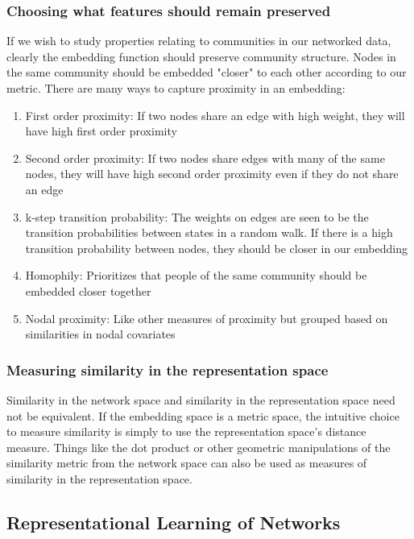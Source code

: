 \documentclass{article}
\begin{document}
\subsubsection{Choosing what features should remain preserved}

If we wish to study properties relating to communities in our networked data, clearly the embedding function should preserve community structure. Nodes in the same community should be embedded "closer" to each other according to our metric. There are many ways to capture proximity in an embedding:

\begin{enumerate}
\item First order proximity: If two nodes share an edge with high weight, they will have high first order proximity
\item Second order proximity: If two nodes share edges with many of the same nodes, they will have high second order proximity even if they do not share an edge
\item k-step transition probability: The weights on edges are seen to be the transition probabilities between states in a random walk. If there is a high transition probability between nodes, they should be closer in our embedding
\item Homophily: Prioritizes that people of the same community should be embedded closer together
\item Nodal proximity: Like other measures of proximity but grouped based on similarities in nodal covariates
\end{enumerate}

\subsubsection{Measuring similarity in the representation space}

Similarity in the network space and similarity in the representation space need not be equivalent. If the embedding space is a metric space, the intuitive choice to measure similarity is simply to use the representation space's distance measure. Things like the dot product or other geometric manipulations of the similarity metric from the network space can also be used as measures of similarity in the representation space.

\subsection{Representational Learning of Networks}
\end{document}
